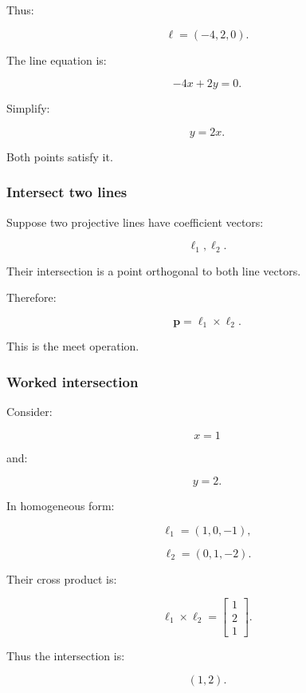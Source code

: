 Thus:

\[
 \boxed{ \boldsymbol\ell=(-4,2,0) }.
\]

The line equation is:

\[
 -4x+2y=0.
\]

Simplify:

\[
 \boxed{y=2x}.
\]

Both points satisfy it.

\subsubsection{Intersect two lines}\label{02-foundations-ii-ch032-intersect-two-lines}

\hypertarget{02-foundations-ii-ch032-intersect-two-lines}{}

Suppose two projective lines have coefficient vectors:

\[
 \boldsymbol\ell_1,\boldsymbol\ell_2.
\]

Their intersection is a point orthogonal to both line vectors.

Therefore:

\[
 \boxed{ \mathbf p=\boldsymbol\ell_1\times\boldsymbol\ell_2 }.
\]

This is the meet operation.

\subsubsection{Worked intersection}\label{02-foundations-ii-ch032-worked-intersection}

\hypertarget{02-foundations-ii-ch032-worked-intersection}{}

Consider:

\[
 x=1
\]

and:

\[
 y=2.
\]

In homogeneous form:

\[
 \boldsymbol\ell_1=(1,0,-1),
\]

\[
 \boldsymbol\ell_2=(0,1,-2).
\]

Their cross product is:

\[
 \boldsymbol\ell_1\times\boldsymbol\ell_2 = \begin{bmatrix} 1\\2\\1 \end{bmatrix}.
\]

Thus the intersection is:

\[
 \boxed{(1,2)}.
\]

